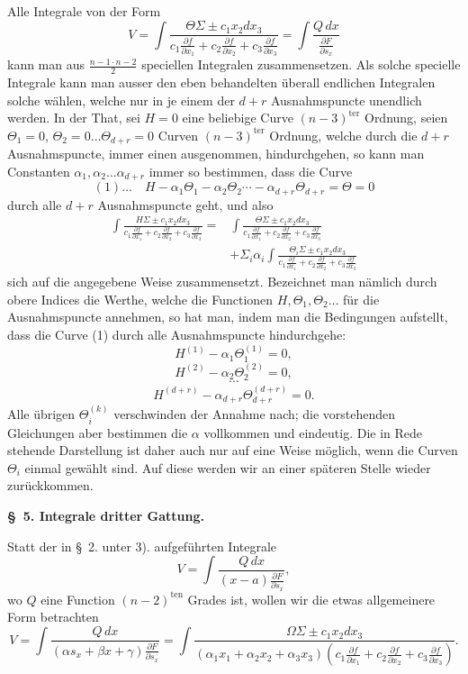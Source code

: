 \documentclass[10pt]{article}
\begin{document}
Alle Integrale von der Form
\[
V=\int\frac{\Theta\Sigma\pm c_1x_2dx_3}{c_1\frac{\partial f}{\partial x_1}+c_2\frac{\partial f}{\partial x_2}+c_3\frac{\partial f}{\partial x_3}}
=\int\frac{Q\,dx}{\frac{\partial F}{\partial s_x}}
\]
kann man aus $\frac{n-1\cdot n-2}{2}$ speciellen Integralen zusammensetzen. Als solche specielle Integrale kann man ausser den eben behandelten überall endlichen Integralen solche wählen, welche nur in je einem der $d+r$ Ausnahmspuncte unendlich werden. In der That, sei $H=0$ eine beliebige Curve $(n-3)^{\mathrm{ter}}$ Ordnung, seien $\Theta_1=0$, $\Theta_2=0\ldots\Theta_{d+r}=0$ Curven $(n-3)^{\mathrm{ter}}$ Ordnung, welche durch die $d+r$ Ausnahmspuncte, immer einen ausgenommen, hindurchgehen, so kann man Constanten $\alpha_1,\alpha_2\ldots\alpha_{d+r}$ immer so bestimmen, dass die Curve
\[
(1)\ldots\quad H-\alpha_1\Theta_1-\alpha_2\Theta_2\cdots-\alpha_{d+r}\Theta_{d+r}=\Theta=0
\]
durch alle $d+r$ Ausnahmspuncte geht, und also
\[
\begin{aligned}
\int\frac{H\Sigma\pm c_1x_2dx_3}{c_1\frac{\partial f}{\partial x_1}+c_2\frac{\partial f}{\partial x_2}+c_3\frac{\partial f}{\partial x_3}}
={}&\int\frac{\Theta\Sigma\pm c_1x_2dx_3}{c_1\frac{\partial f}{\partial x_1}+c_2\frac{\partial f}{\partial x_2}+c_3\frac{\partial f}{\partial x_3}}\\
&+\Sigma_i\alpha_i\int\frac{\Theta_i\Sigma\pm c_1x_2dx_3}{c_1\frac{\partial f}{\partial x_1}+c_2\frac{\partial f}{\partial x_2}+c_3\frac{\partial f}{\partial x_3}}
\end{aligned}
\]
sich auf die angegebene Weise zusammensetzt. Bezeichnet man nämlich durch obere Indices die Werthe, welche die Functionen $H,\Theta_1,\Theta_2\ldots$ für die Ausnahmspuncte annehmen, so hat man, indem man die Bedingungen aufstellt, dass die Curve (1) durch alle Ausnahmspuncte hindurchgehe:
\[
H^{(1)}-\alpha_1\Theta_1^{(1)}=0,
\]
\[
H^{(2)}-\alpha_2\Theta_2^{(2)}=0,
\]
\[
\cdots
\]
\[
H^{(d+r)}-\alpha_{d+r}\Theta_{d+r}^{(d+r)}=0.
\]
Alle übrigen $\Theta_i^{(k)}$ verschwinden der Annahme nach; die vorstehenden Gleichungen aber bestimmen die $\alpha$ vollkommen und eindeutig. Die in Rede stehende Darstellung ist daher auch nur auf eine Weise möglich, wenn die Curven $\Theta_i$ einmal gewählt sind. Auf diese werden wir an einer späteren Stelle wieder zurückkommen.

\begin{center}
{\bfseries \S\ 5. Integrale dritter Gattung.}
\end{center}

Statt der in \S\ 2. unter 3). aufgeführten Integrale
\[
V=\int\frac{Q\,dx}{(x-a)\frac{\partial F}{\partial s_x}},
\]
wo $Q$ eine Function $(n-2)^{\mathrm{ten}}$ Grades ist, wollen wir die etwas allgemeinere Form betrachten
\[
V=\int\frac{Q\,dx}{(\alpha s_x+\beta x+\gamma)\frac{\partial F}{\partial s_x}}
=\int\frac{\Omega\Sigma\pm c_1x_2dx_3}{(\alpha_1x_1+\alpha_2x_2+\alpha_3x_3)\left(c_1\frac{\partial f}{\partial x_1}+c_2\frac{\partial f}{\partial x_2}+c_3\frac{\partial f}{\partial x_3}\right)}.
\]
\end{document}

